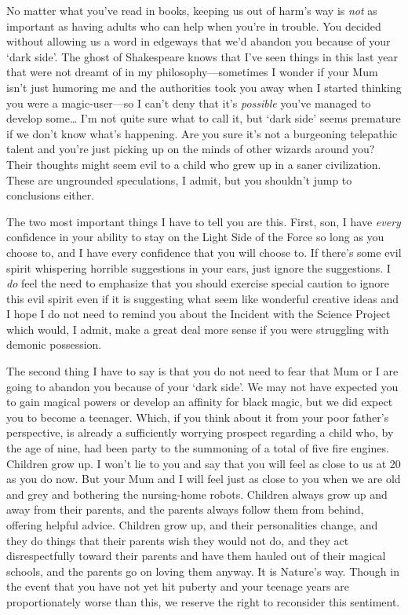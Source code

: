 \begin{writtenNote}

No matter what you've read in books, keeping us out of harm's way is \emph{not} as important as having adults who can help when you're in trouble. You decided without allowing us a word in edgeways that we'd abandon you because of your `dark side'. The ghost of Shakespeare knows that I've seen things in this last year that were not dreamt of in my philosophy—sometimes I wonder if your Mum isn't just humoring me and the authorities took you away when I started thinking you were a magic-user—so I can't deny that it's \emph{possible} you've managed to develop some{\ldots} I'm not quite sure what to call it, but `dark side' seems premature if we don't know what's happening. Are you sure it's not a burgeoning telepathic talent and you're just picking up on the minds of other wizards around you? Their thoughts might seem evil to a child who grew up in a saner civilization. These are ungrounded speculations, I admit, but you shouldn't jump to conclusions either.

The two most important things I have to tell you are this. First, son, I have \emph{every} confidence in your ability to stay on the Light Side of the Force so long as you choose to, and I have every confidence that you will choose to. If there's some evil spirit whispering horrible suggestions in your ears, just ignore the suggestions. I \emph{do} feel the need to emphasize that you should exercise special caution to ignore this evil spirit even if it is suggesting what seem like wonderful creative ideas and I hope I do not need to remind you about the Incident with the Science Project which would, I admit, make a great deal more sense if you were struggling with demonic possession.

The second thing I have to say is that you do not need to fear that Mum or I are going to abandon you because of your `dark side'. We may not have expected you to gain magical powers or develop an affinity for black magic, but we did expect you to become a teenager. Which, if you think about it from your poor father's perspective, is already a sufficiently worrying prospect regarding a child who, by the age of nine, had been party to the summoning of a total of five fire engines. Children grow up. I won't lie to you and say that you will feel as close to us at 20 as you do now. But your Mum and I will feel just as close to you when we are old and grey and bothering the nursing-home robots. Children always grow up and away from their parents, and the parents always follow them from behind, offering helpful advice. Children grow up, and their personalities change, and they do things that their parents wish they would not do, and they act disrespectfully toward their parents and have them hauled out of their magical schools, and the parents go on loving them anyway. It is Nature's way. Though in the event that you have not yet hit puberty and your teenage years are proportionately worse than this, we reserve the right to reconsider this sentiment.


\end{writtenNote}
